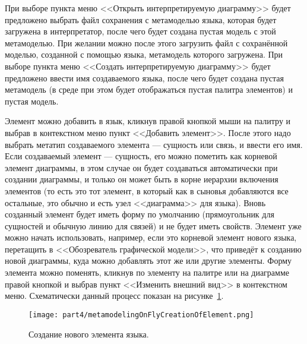 При выборе пункта меню <<Открыть интерпретируемую диаграмму>> будет предложено выбрать 
файл сохранения с метамоделью языка, которая будет загружена в интерпретатор, после 
чего будет создана пустая модель с этой метамоделью. При желании можно после этого 
загрузить файл с сохранённой моделью, созданной с помощью языка, метамодель которого 
загружена. При выборе пункта меню <<Создать интерпретируемую диаграмму>> будет предложено 
ввести имя создаваемого языка, после чего будет создана пустая метамодель (в среде 
при этом будет отображаться пустая палитра элементов) и пустая модель.

Элемент можно добавить в язык, кликнув правой кнопкой мыши на палитру и выбрав в контекстном 
меню пункт <<Добавить элемент>>. После этого надо выбрать метатип создаваемого элемента 
--- сущность или связь, и ввести его имя. Если создаваемый элемент --- сущность, его
можно пометить как корневой элемент диаграммы, в этом случае он будет создаваться 
автоматически при создании диаграммы, и только он может быть в корне иерархии включения 
элементов (то есть это тот элемент, в который как в сыновья добавляются все остальные, 
это обычно и есть узел <<диаграмма>> для языка). Вновь созданный элемент будет иметь 
форму по умолчанию (прямоугольник для сущностей и обычную линию для связей) и не будет 
иметь свойств. Элемент уже можно начать использовать, например, если это корневой 
элемент нового языка, перетащить в <<Обозреватель графической модели>>, что приведёт 
к созданию новой диаграммы, куда можно добавлять этот же или другие элементы. Форму 
элемента можно поменять, кликнув по элементу на палитре или на диаграмме правой кнопкой 
и выбрав пункт <<Изменить внешний вид>> в контекстном меню. Схематически данный процесс 
показан на рисунке~\ref{image:metamodelingOnFlyCreationOfElement}.

\begin{figure} [ht]
	\begin{center}
		\texttt{[image: part4/metamodelingOnFlyCreationOfElement.png]}
		\caption{Создание нового элемента языка.}
		\label{image:metamodelingOnFlyCreationOfElement}
	\end{center}
\end{figure}

